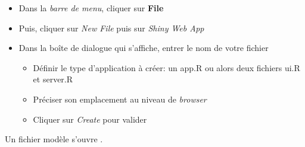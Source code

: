 \documentclass[
]{article}
\providecommand{\tightlist}{%
  \setlength{\itemsep}{0pt}\setlength{\parskip}{0pt}}
\begin{document}
\begin{itemize}
\item
  Dans la \emph{barre de menu}, cliquer sur \textbf{File}
\item
  Puis, cliquer sur \emph{New File} puis sur \emph{Shiny Web App}
\item
  Dans la boîte de dialogue qui s'affiche, entrer le nom de votre
  fichier

  \begin{itemize}
  \tightlist
  \item
    Définir le type d'application à créer: un app.R ou alors deux
    fichiers ui.R et server.R
  \item
    Préciser son emplacement au niveau de \emph{browser}
  \item
    Cliquer sur \emph{Create} pour valider
  \end{itemize}
\end{itemize}

Un fichier modèle s'ouvre .
\end{document}
